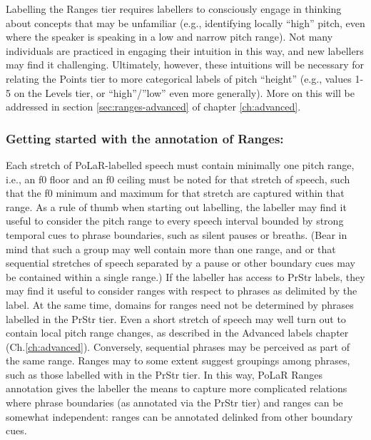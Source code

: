 \documentclass[11pt, twoside]{memoir}
\def\textlabel#1{{\relsize{-.5}\fontspec[Mapping=tex-text]{Roboto Mono}{#1}}}
\begin{document}
{{Labelling the Ranges tier requires labellers to consciously engage in thinking about concepts that may be unfamiliar (e.g., identifying locally “high” pitch, even where the speaker is speaking in a low and narrow pitch range). Not many individuals are practiced in engaging their intuition in this way, and new labellers may find it challenging. Ultimately, however, these intuitions will be necessary for relating the Points tier to more categorical labels of pitch “height” (e.g., values 1-5 on the Levels tier, or “high”\slash ”low” even more generally). More on this will be addressed in section \ref{sec:ranges-advanced} of chapter \ref{ch:advanced}.
\subsubsection{Getting started with the annotation of Ranges:}\label{sec:getting-started-with-the-annotation-of-ranges}
Each stretch of PoLaR-labelled speech must contain minimally one pitch range, i.e., an f0 floor and an f0 ceiling must be noted for that stretch of speech, such that the f0 minimum and maximum for that stretch are captured within that range. As a rule of thumb when starting out labelling, the labeller may find it useful to consider the pitch range to every speech interval bounded by strong temporal cues to phrase boundaries, such as silent pauses or breaths. (Bear in mind that such a group may well contain more than one range, and or that sequential stretches of speech separated by a pause or other boundary cues may be contained within a single range.)
If the labeller has access to PrStr labels, they may find it useful to consider ranges with respect to phrases as delimited by the \textlabel{]} label. At the same time, domains for ranges need not be determined by phrases labelled in the PrStr tier. Even a short stretch of speech may well turn out to contain local pitch range changes, as described in the Advanced labels chapter (Ch.\ref{ch:advanced}). Conversely, sequential phrases may be perceived as part of the same range. Ranges may to some extent suggest groupings among phrases, such as those labelled with \textlabel{]} in the PrStr tier. In this way, PoLaR Ranges annotation gives the labeller the means to capture more complicated relations where phrase boundaries (as annotated via the PrStr tier) and ranges can be somewhat independent: ranges can be annotated delinked from other boundary cues.
}}
\end{document}

